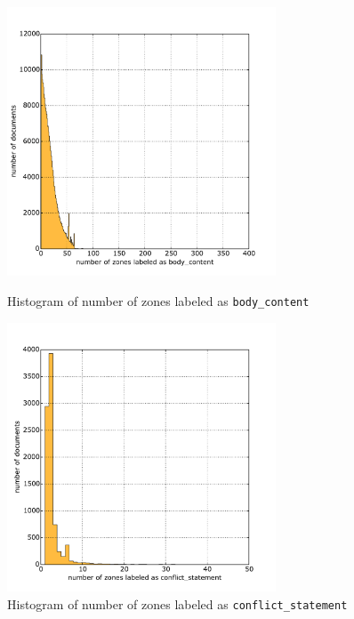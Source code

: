 \begin{figure}
\centering
\begin{minipage}[t!]{0.48\linewidth}
  \includegraphics[width=8cm]{plots/body_content_histogram}
  \caption{Histogram of number of zones labeled as \texttt{body\_content}}
  \label{fig:body_content_histogram}
\end{minipage}
\quad
\begin{minipage}[t!]{0.48\linewidth}
  \includegraphics[width=8cm]{plots/conflict_statement_histogram}
  \caption{Histogram of number of zones labeled as \texttt{conflict\_statement}}
  \label{fig:conflict_statement_histogram}
\end{minipage}
\end{figure}

